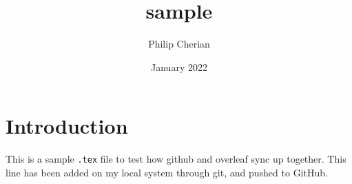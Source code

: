 \documentclass{article}
\title{sample}
\author{Philip Cherian}
\date{January 2022}
\begin{document}
\maketitle

\section{Introduction}

This is a sample \texttt{.tex} file to test how github and overleaf sync up together. This line has been added on my local system through git, and pushed to GitHub.
\end{document}
